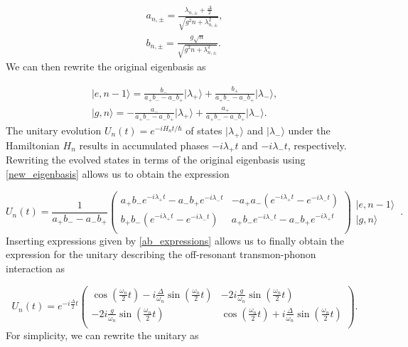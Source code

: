 \documentclass[12pt]{article}
\newcommand{\ket}[1]{\ensuremath{|{#1}\rangle}}
\begin{document}
\begin{equation}
\label{ab_expressions}
\begin{split}
a_{n,\pm} = \frac{\lambda_{n,\pm} + \frac{\Delta}{2}}{\sqrt{g^2n+\lambda^2_{n,\pm}}}, \\
b_{n,\pm} = \frac{g\sqrt{n}}{\sqrt{g^2n+\lambda^2_{n,\pm}}}.
\end{split}
\end{equation}
We can then rewrite the original eigenbasis as

\begin{equation}
\begin{split}
\ket{e, n-1} = \frac{b_-}{a_+b_- - a_-b_+}\ket{\lambda_+} + \frac{b_+}{a_+b_- - a_-b_+}\ket{\lambda_-}, \\
\ket{g, n} = -\frac{a_-}{a_+b_- - a_-b_+}\ket{\lambda_+} + \frac{a_+}{a_+b_- - a_-b_+}\ket{\lambda_-}.
\end{split}
\end{equation}
The unitary evolution $U_n(t) = e^{-iH_n t/ \hbar}$ of states $\ket{\lambda_+}$ and $\ket{\lambda_-}$ under the Hamiltonian $H_n$ results in accumulated phases $-i\lambda_+ t$ and $-i\lambda_- t$, respectively. Rewriting the evolved states in terms of the original eigenbasis using \ref{new_eigenbasis} allows us to obtain the expression

\begin{equation}
U_n(t) = \frac{1}{a_+b_- - a_-b_+}\begin{pmatrix}
a_+b_-e^{-i\lambda_+t} - a_-b_+e^{-i\lambda_-t} & -a_+a_-\left(e^{-i\lambda_+t}-e^{-i\lambda_-t}\right) \\
b_+b_-\left(e^{-i\lambda_+t}-e^{-i\lambda_-t}\right) & a_+b_-e^{-i\lambda_-t} - a_-b_+e^{-i\lambda_+t} \\
\end{pmatrix}
\begin{matrix}
    \ket{e, n-1}\\
    \ket{g, n}
\end{matrix}\,.
\end{equation}
Inserting expressions given by \ref{ab_expressions} allows us to finally obtain the expression for the unitary describing the off-resonant transmon-phonon interaction as

\begin{equation}
\label{unitary_general}
U_n(t) = e^{-i\frac{\Delta}{2}t}\begin{pmatrix}
\cos\left(\frac{\omega_n}{2}t\right) - i\frac{\Delta}{\omega_n} \sin\left(\frac{\omega_n}{2}t\right) & -2i\frac{g}{\omega_n} \sin\left(\frac{\omega_n}{2}t\right) \\
-2i\frac{g}{\omega_n} \sin\left(\frac{\omega_n}{2}t\right) & \cos\left(\frac{\omega_n}{2}t\right) + i\frac{\Delta}{\omega_n} \sin\left(\frac{\omega_n}{2}t\right) \\
\end{pmatrix}.
\end{equation}
For simplicity, we can rewrite the unitary as
\end{document}
